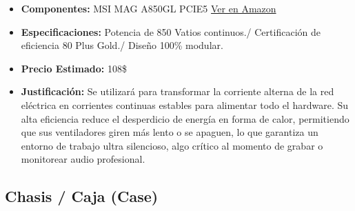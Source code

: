 \documentclass[12pt,a4paper]{article}
\begin{document}
\begin{itemize}
    \item \textbf{Componentes:} MSI MAG A850GL PCIE5
    \href{https://www.amazon.com/-/es/MSI-A850GL-alimentaci%C3%B3n-compacta-completamente/dp/B0CB9MSJ5N/ref=sr_1_5?__mk_es_US=%C3%85M%C3%85%C5%BD%C3%95%C3%91&crid=JDG38I52W8JB&dib=eyJ2IjoiMSJ9.p-Aq6eVB7Oe8KG_DmzSh5ysgrMeDgEJm_W_rz3ANKZ8Rv484Cp-Q9EFmFkdw0l_yhJVbei_k-weHiJ8x9-n5Z-1EUMm-uzh6TxKQPYuvnqWFW38HknwavU_mf08HKfrGLH_DuK4-JjavctjJQbC_5P1piHbPRGV3AHDE-aMBwNlcqvZDLEodQLEocMq4pEvYlCzxJHMTz82FEfDI1RFNsC_kfWDqLEUwu7IPzxHvk1g.SuGIZDf1YhiT0plsaYtV69ID0hUGaULP87Z7k7DJ5e4&dib_tag=se&keywords=fuente%2Bde%2Balimentacion%2BPotencia%2Bde%2B850%2BVatios%2Bcontinuos.%2F%2BCertificaci%C3%B3n%2Bde%2Beficiencia%2B80%2BPlus%2BGold.%2F%2BDise%C3%B1o%2B100%5C%25%2Bmodular.&nsdOptOutParam=true&qid=1779459594&sprefix=fuente%2Bde%2Balimentacion%2Bpotencia%2Bde%2B850%2Bvatios%2Bcontinuos.%2F%2Bcertificaci%C3%B3n%2Bde%2Beficiencia%2B80%2Bplus%2Bgold.%2F%2Bdise%C3%B1o%2B100%2B%25%2Bmodular.%2Caps%2C345&sr=8-5&th=1}{Ver en Amazon}
    \item \textbf{Especificaciones:} Potencia de 850 Vatios continuos./ Certificación de eficiencia 80 Plus Gold./ Diseño 100\% modular.
    \item \textbf{Precio Estimado:} 108\$
    \item \textbf{Justificación:} Se utilizará para transformar la corriente alterna de la red eléctrica en corrientes continuas estables para alimentar todo el hardware. Su alta eficiencia reduce el desperdicio de energía en forma de calor, permitiendo que sus ventiladores giren más lento o se apaguen, lo que garantiza un entorno de trabajo ultra silencioso, algo crítico al momento de grabar o monitorear audio profesional.
\end{itemize}

\subsection{Chasis / Caja (Case)}
\end{document}
